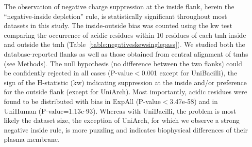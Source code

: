 The observation of negative charge suppression at the inside flank, herein the ``negative-inside depletion'' rule, is statistically significant throughout most datasets in this study.
The inside-outside bias was counted using the \gls{kw} test comparing the occurrence of acidic residues within 10 residues of each \gls{tmh} inside and outside the \gls{tmh} (Table~\ref{table:negativeskewsinglepass}).
We studied both the database-reported flanks as well as those obtained from central alignment of \gls{tmh}s (see Methods).
The null hypothesis (no difference between the two flanks) could be confidently rejected in all cases (P-value$<$0.001 except for UniBacilli), the sign of the H-statistic (\gls{kw}) indicating suppression at the inside and/or preference for the outside flank (except for UniArch).
Most importantly, acidic residues were found to be distributed with bias in ExpAll (P-value$<$3.47e-58) and in UniHuman (P-value=1.13e-93).
Whereas with UniBacilli, the problem is most likely the dataset size, the exception of UniArch, for which we observe a strong negative inside rule, is more puzzling and indicates biophysical differences of their plasma-membrane.

